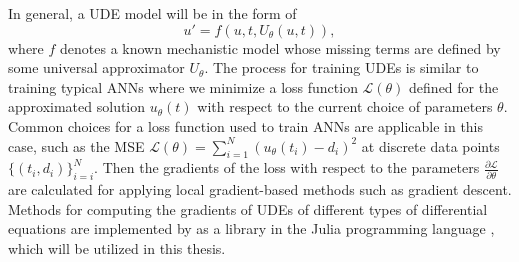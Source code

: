 In general, a \gls{UDE} model will be in the form of \cite{rackauckasUniversalDifferentialEquations2020}
\begin{equation*}
    u' = f(u, t, U_\theta(u, t)),
\end{equation*}
where $f$ denotes a known mechanistic model whose missing terms are defined by some universal approximator $U_\theta$.
The process for training \glspl{UDE} is similar to training typical \glspl{ANN} where we minimize a loss function $\mathcal{L}(\theta)$ defined for the approximated solution $u_\theta(t)$ with respect to the current choice of parameters $\theta$.
Common choices for a loss function used to train \glspl{ANN} are applicable in this case, such as the \gls{MSE} $\mathcal{L}(\theta) = \sum_{i=1}^{N} (u_\theta(t_i) - d_i)^2$ at discrete data points $\{(t_i, d_i)\}_{i=i}^N$.
Then the gradients of the loss with respect to the parameters $\frac{\partial\mathcal{L}}{\partial\theta}$ are calculated for applying local gradient-based methods such as gradient descent.
Methods for computing the gradients of \glspl{UDE} of different types of differential equations are implemented by \citeauthor{rackauckasUniversalDifferentialEquations2020} \cite{rackauckasUniversalDifferentialEquations2020} as a library in the Julia programming language \cite{bezanson2012julia}, which will be utilized in this thesis.